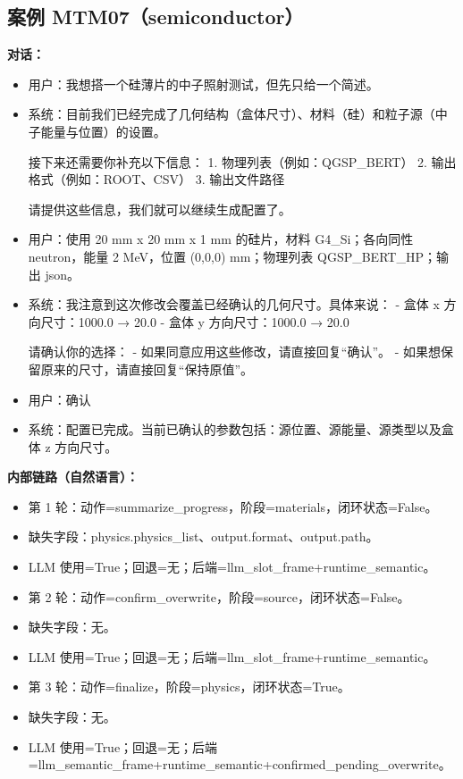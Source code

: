\documentclass[11pt]{ctexart}
\begin{document}
\subsection{案例 MTM07（semiconductor）}
\textbf{对话：}
\begin{itemize}
\item 用户：我想搭一个硅薄片的中子照射测试，但先只给一个简述。
\item 系统：目前我们已经完成了几何结构（盒体尺寸）、材料（硅）和粒子源（中子能量与位置）的设置。

接下来还需要你补充以下信息：
1. 物理列表（例如：QGSP\_BERT）
2. 输出格式（例如：ROOT、CSV）
3. 输出文件路径

请提供这些信息，我们就可以继续生成配置了。
\item 用户：使用 20 mm x 20 mm x 1 mm 的硅片，材料 G4\_Si；各向同性 neutron，能量 2 MeV，位置 (0,0,0) mm；物理列表 QGSP\_BERT\_HP；输出 json。
\item 系统：我注意到这次修改会覆盖已经确认的几何尺寸。具体来说：
- 盒体 x 方向尺寸：1000.0 → 20.0
- 盒体 y 方向尺寸：1000.0 → 20.0

请确认你的选择：
- 如果同意应用这些修改，请直接回复“确认”。
- 如果想保留原来的尺寸，请直接回复“保持原值”。
\item 用户：确认
\item 系统：配置已完成。当前已确认的参数包括：源位置、源能量、源类型以及盒体 z 方向尺寸。
\end{itemize}
\textbf{内部链路（自然语言）：}
\begin{itemize}
\item 第 1 轮：动作=summarize\_progress，阶段=materials，闭环状态=False。
\item 缺失字段：physics.physics\_list、output.format、output.path。
\item LLM 使用=True；回退=无；后端=llm\_slot\_frame+runtime\_semantic。
\item 第 2 轮：动作=confirm\_overwrite，阶段=source，闭环状态=False。
\item 缺失字段：无。
\item LLM 使用=True；回退=无；后端=llm\_slot\_frame+runtime\_semantic。
\item 第 3 轮：动作=finalize，阶段=physics，闭环状态=True。
\item 缺失字段：无。
\item LLM 使用=True；回退=无；后端=llm\_semantic\_frame+runtime\_semantic+confirmed\_pending\_overwrite。
\end{itemize}
\end{document}
